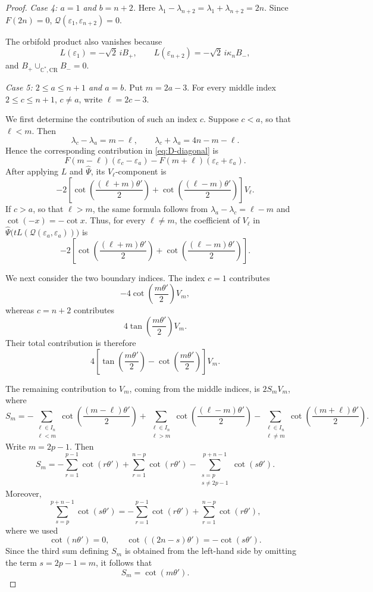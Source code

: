 \documentclass[a4paper,reqno]{amsart}
\theoremstyle{plain} %
\theoremstyle{definition} %
\theoremstyle{remark} %
\newcommand{\1}{\mathds{1}}   %
\begin{document}
\begin{proof}
\medskip
\noindent
\textit{Case 4: \(a=1\) and \(b=n+2\).}
Here $\lambda_1-\lambda_{n+2} = \lambda_1+\lambda_{n+2} = 2n$. Since \(F(2n)=0\),
$\mathcal Q(\varepsilon_1,\varepsilon_{n+2})=0$.

The orbifold product also vanishes because
\[
L(\varepsilon_1)
=
-\sqrt2\,iB_+,
\qquad
L(\varepsilon_{n+2})
=
-\sqrt2\, i\kappa_nB_-,
\]
and $B_+\cup_{\mathbb C^*,\mathrm{CR}}B_-=0$. 

\medskip
\noindent
\textit{Case 5: \(2\le a\le n+1\) and \(a=b\).}
Put $m=2a-3$. For every middle index $2\le c\le n+1$, $c\ne a$, write $\ell=2c-3$. 

We first determine the contribution of such an index \(c\).
Suppose \(c<a\), so that \(\ell<m\). Then
\[
\lambda_c-\lambda_a=m-\ell,
\qquad
\lambda_c+\lambda_a=4n-m-\ell.
\]
Hence the corresponding contribution in
\eqref{eq:D-diagonal} is
\[
F(m-\ell)(\varepsilon_c-\varepsilon_a)
-
F(m+\ell)(\varepsilon_c+\varepsilon_a).
\]
After applying \(L\) and \(\widehat\Psi\), its
\(V_\ell\)-component is
\[
-2
\left[
\cot\left(\frac{(\ell+m)\theta'}{2}\right)
+
\cot\left(\frac{(\ell-m)\theta'}{2}\right)
\right]V_\ell.
\]
If \(c>a\), so that \(\ell>m\), the same formula follows from $\lambda_a-\lambda_c=\ell-m$
and $\cot(-x)=-\cot x$. 
Thus, for every \(\ell\ne m\), the coefficient of \(V_\ell\)
in $\widehat\Psi \bigl( tL(\mathcal Q(\varepsilon_a,\varepsilon_a)) \bigr)$
is
\[
-2
\left[
\cot\left(\frac{(\ell+m)\theta'}{2}\right)
+
\cot\left(\frac{(\ell-m)\theta'}{2}\right)
\right].
\]

We next consider the two boundary indices.
The index \(c=1\) contributes
\[
-4\cot\left(\frac{m\theta'}{2}\right)V_m,
\]
whereas \(c=n+2\) contributes
\[
4\tan\left(\frac{m\theta'}{2}\right)V_m.
\]
Their total contribution is therefore
\[
4
\left[
\tan\left(\frac{m\theta'}{2}\right)
-
\cot\left(\frac{m\theta'}{2}\right)
\right]V_m.
\]

The remaining contribution to \(V_m\), coming from the middle
indices, is \(2S_mV_m\), where
\[
S_m
=
-\sum_{\substack{\ell\in I_n\\\ell<m}}
\cot\left(\frac{(m-\ell)\theta'}{2}\right)
+
\sum_{\substack{\ell\in I_n\\\ell>m}}
\cot\left(\frac{(\ell-m)\theta'}{2}\right)
-
\sum_{\substack{\ell\in I_n\\\ell\ne m}}
\cot\left(\frac{(m+\ell)\theta'}{2}\right).
\]
Write $m=2p-1$. 
Then
\[
S_m
=
-\sum_{r=1}^{p-1}\cot(r\theta')
+
\sum_{r=1}^{n-p}\cot(r\theta')
-
\sum_{\substack{s=p\\s\ne2p-1}}^{p+n-1}
\cot(s\theta').
\]
Moreover,
\[
\sum_{s=p}^{p+n-1}\cot(s\theta')
=
-\sum_{r=1}^{p-1}\cot(r\theta')
+
\sum_{r=1}^{n-p}\cot(r\theta'),
\]
where we used
\[
\cot(n\theta')=0,
\qquad
\cot((2n-s)\theta')=-\cot(s\theta').
\]
Since the third sum defining \(S_m\) is obtained from the
left-hand side by omitting the term $s=2p-1=m$, 
it follows that
\[
S_m=\cot(m\theta').
\]


\end{proof}
\end{document}
